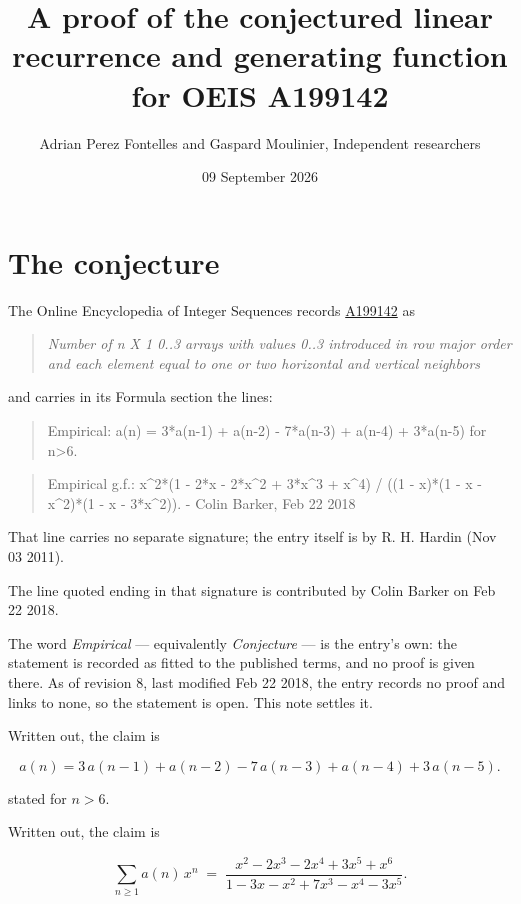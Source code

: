 \documentclass[11pt]{article}
\title{A proof of the conjectured linear recurrence and generating function for OEIS A199142}
\author{Adrian Perez Fontelles and Gaspard Moulinier, Independent researchers}
\date{09 September 2026}
\theoremstyle{definition}
\begin{document}
\maketitle
\section{The conjecture}

The Online Encyclopedia of Integer Sequences records \href{https://oeis.org/A199142}{A199142} as

\begin{quote}\itshape Number of n X 1 0..3 arrays with values 0..3 introduced in row major order and each element equal to one or two horizontal and vertical neighbors\end{quote}

and carries in its Formula section the lines:

\begin{quote}\ttfamily Empirical: a(n) = 3*a(n-1) + a(n-2) - 7*a(n-3) + a(n-4) + 3*a(n-5) for n>6.\end{quote}

\begin{quote}\ttfamily Empirical g.f.: x\textasciicircum{}2*(1 - 2*x - 2*x\textasciicircum{}2 + 3*x\textasciicircum{}3 + x\textasciicircum{}4) / ((1 - x)*(1 - x - x\textasciicircum{}2)*(1 - x - 3*x\textasciicircum{}2)). - Colin Barker, Feb 22 2018\end{quote}

That line carries no separate signature; the entry itself is by R. H. Hardin (Nov 03 2011).

The line quoted ending in that signature is contributed by Colin Barker on Feb 22 2018.

The word {\itshape Empirical} --- equivalently {\itshape Conjecture} --- is the entry's own: the statement is recorded as fitted to the published terms, and no proof is given there. As of revision 8, last modified Feb 22 2018, the entry records no proof and links to none, so the statement is open. This note settles it.

Written out, the claim is

\[a(n) = 3\,a(n-1) + a(n-2) - 7\,a(n-3) + a(n-4) + 3\,a(n-5).\]

stated for $n > 6$.

Written out, the claim is

\[\sum_{n \ge 1} a(n)\,x^n \;=\; \frac{x^{2} - 2x^{3} - 2x^{4} + 3x^{5} + x^{6}}{1 - 3x - x^{2} + 7x^{3} - x^{4} - 3x^{5}}.\]
\end{document}
